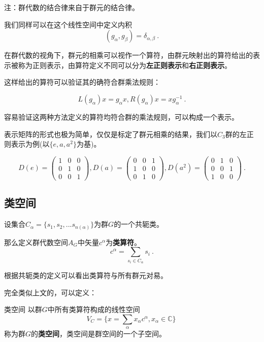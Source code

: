 注：群代数的结合律来自于群元的结合律。

我们同样可以在这个线性空间中定义内积
$$(g_\alpha,g_\beta)=\delta_{\alpha,\beta}~.$$

在群代数的视角下，群元的相乘可以视作一个算符，由群元映射出的算符给出的表示被称为正则表示，由算符定义不同可以分为\textbf{左正则表示}和\textbf{右正则表示}。

这样给出的算符可以验证其的确符合群乘法规则：

$$L(g_\alpha)x=g_\alpha x,R(g_\alpha)x=xg_\alpha^{-1}~.$$

容易验证这两种方法定义的算符均符合群的乘法规则，可以构成一个表示。

表示矩阵的形式也极为简单，仅仅是标定了群元相乘的结果，我们以$C_3$群的左正则表示为例(以$\{e,a,a^2\}$为基)。

$$D(e)=\begin{pmatrix}
 1& 0& 0\\
 0 &1 & 0 \\
 0&0&1
 \end{pmatrix},
 D(a)=\begin{pmatrix}
 0&0& 1\\
 1&0 & 0 \\
 0&1&0
 \end{pmatrix},
 D(a^2)=\begin{pmatrix}
 0& 1& 0\\
 0 &0 & 1 \\
 1&0&0
\end{pmatrix}~.$$

\subsection{类空间}

\begin{definition}{}
设集合$C_\alpha=\{s_1,s_2,...s_{n(\alpha)}\}$为群$G$的一个共轭类。

那么定义群代数空间$A_G$中矢量$c^\alpha$为\textbf{类算符}。
$$c^\alpha=\displaystyle\sum_{s_i\in C_\alpha}s_i~.$$
\end{definition}

根据共轭类的定义可以看出类算符与所有群元对易。

完全类似上文的，可以定义：
\begin{definition}{类空间}
以群$G$中所有类算符构成的线性空间
$$V_C=\{x=\displaystyle\sum_\alpha x_\alpha c^\alpha,x_\alpha \in \mathbb{C}\}~$$
称为群$G$的\textbf{类空间}，类空间是群空间的一个子空间。
\end{definition}
